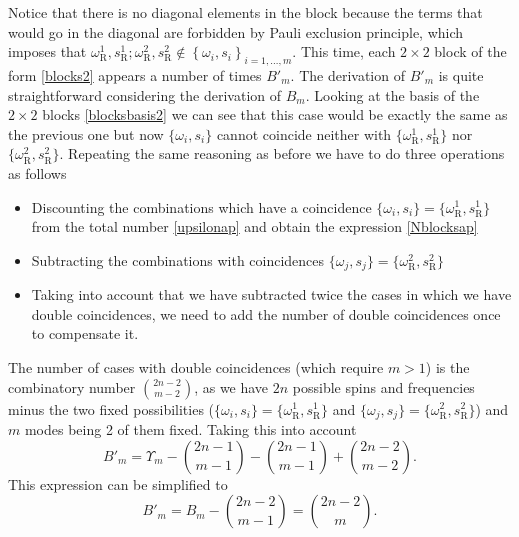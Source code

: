 Notice that there is no diagonal elements in the block because the terms that would go in the diagonal are forbidden by Pauli exclusion principle,  which imposes 
that $\omega^1_\text{R},s^1_\text{R};\omega^2_\text{R},s^2_\text{R}\not\in\left\{\omega_i,s_i\right\}_{i=1,\dots,m}$. This time, each $2\times2$ block of the form \eqref{blocks2} appears a number of  times $B'_m$. The derivation of $B'_m$ is quite straightforward considering the derivation of $B_m$. Looking at the basis of the $2\times2$ blocks \eqref{blocksbasis2} we can see that this case would be exactly the same as the previous one but now $\{\omega_i,s_i\}$ cannot coincide neither with $\{\omega_\text{R}^1,s_\text{R}^1\}$ nor $\{\omega_\text{R}^2,s_\text{R}^2\}$. Repeating the same reasoning as before we have to do three operations as follows
\begin{itemize}
\item Discounting the combinations which have a coincidence $\{\omega_i,s_i\}=\{\omega_\text{R}^1,s_\text{R}^1\}$ from the total number \eqref{upsilonap} and obtain the expression \eqref{Nblocksap}
\item Subtracting the combinations with coincidences $\{\omega_j,s_j\}=\{\omega_\text{R}^2,s_\text{R}^2\}$
\item Taking into account that we have subtracted twice the cases in which we have double coincidences, we need to add the number of double coincidences once to compensate it.
\end{itemize}
 The number of cases with double coincidences (which require $m>1$) is the combinatory number $\binom{2n-2}{m-2}$, as we have $2n$ possible spins and frequencies minus the two fixed possibilities ($\{\omega_i,s_i\}=\{\omega_\text{R}^1,s_\text{R}^1\}$ and $\{\omega_j,s_j\}=\{\omega_\text{R}^2,s_\text{R}^2\}$) and $m$ modes being 2 of them fixed. Taking this into account
\begin{equation}\label{apend2}
B'_m=\Upsilon_m -\binom{2n-1}{m-1}-\binom{2n-1}{m-1} + \binom{2n-2}{m-2}.
\end{equation}
This expression can be simplified to
\begin{equation}\label{Nblocks2ap}B'_m=B_m-\binom{2n-2}{m-1}=\binom{2n-2}{m}.
\end{equation}

